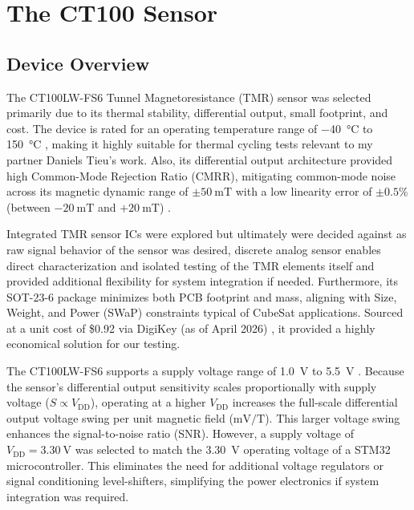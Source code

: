 \documentclass[12pt,a4paper]{article}
\begin{document}
\section{The CT100 Sensor}
\label{sec:ct100}

\subsection{Device Overview}
\label{sec:ct100-overview}

The \mbox{CT100LW-FS6} Tunnel Magnetoresistance (TMR) sensor was selected primarily due to its thermal stability, differential output, small footprint, and cost. The device is rated for an operating temperature range of \SI{-40}{\degreeCelsius} to \SI{150}{\degreeCelsius} \cite{ct100_datasheet}, making it highly suitable for  thermal cycling  tests relevant to my partner Daniels Tieu's work. Also, its differential output architecture provided high Common-Mode Rejection Ratio (CMRR), mitigating common-mode noise across its magnetic dynamic range of $\pm50~\text{mT}$ with a low linearity error of $\pm0.5\%$ (between $-20~\text{mT}$ and $+20~\text{mT}$) \cite{ct100_datasheet}. 

Integrated TMR sensor ICs were explored but ultimately were decided against as raw signal behavior of the sensor was desired,  discrete analog sensor enables direct characterization and isolated testing of the TMR elements itself and provided additional flexibility for system integration if needed. Furthermore, its SOT-23-6 package minimizes both PCB footprint and mass, aligning with  Size, Weight, and Power (SWaP) constraints typical of CubeSat applications. Sourced at a unit cost of \$0.92 via DigiKey (as of April 2026) \cite{digikey_ct100}, it provided a highly economical solution for our testing.

The \mbox{CT100LW-FS6} supports a supply voltage range of \SI{1.0}{\volt} to \SI{5.5}{\volt} \cite{ct100_datasheet}. Because the sensor's differential output sensitivity scales proportionally with supply voltage ($S \propto V_{\text{DD}}$), operating at a higher $V_{\text{DD}}$ increases the full-scale differential output voltage swing per unit magnetic field ($\text{mV/T}$). This larger voltage swing enhances the signal-to-noise ratio (SNR). However, a supply voltage of $V_{\text{DD}} = \SI{3.30}{\volt}$ was selected to match the \SI{3.30}{\volt} operating voltage of a STM32 microcontroller. This eliminates the need for additional voltage regulators or signal conditioning level-shifters, simplifying the power electronics if system integration was required.
\end{document}
